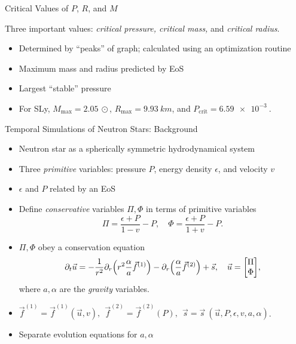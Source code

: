 \documentclass[handout]{beamer}
\newcommand{\p}{\partial}
\begin{document}
\begin{frame}{Critical Values of $P$, $R$, and $M$}
\begin{figure}[h!]
\begin{subfigure}{.5\textwidth}
            \end{subfigure}
        \end{figure} \pause
        Three important values: \pause \textit{critical pressure, critical mass,} and \textit{critical radius}. \pause 
        \begin{itemize}
            \item Determined by ``peaks'' of graph\pause ; calculated using an optimization routine \pause
            \item Maximum mass and radius predicted by EoS \pause
            \item Largest ``stable'' pressure \pause
            \item For SLy, $M_\text{max} = \SI{2.05}{\odot}$, $R_\text{max} = \SI{9.93}{km}$, and $P_\text{crit} = \SI{6.59e-3}{}$.
        \end{itemize}

    \end{frame}



    \begin{frame}{Temporal Simulations of Neutron Stars: Background}
        \begin{itemize}
            \item Neutron star as a spherically symmetric hydrodynamical system
            \item Three \textit{primitive} variables: pressure $P$, energy density $\epsilon$, and velocity $v$
            \item $\epsilon$ and $P$ related by an EoS
            \item Define \textit{conservative} variables $\Pi, \Phi$ in terms of primitive variables
            \[\Pi = \frac{\epsilon + P}{1-v} - P, \quad \Phi = \frac{\epsilon + P}{1+v} - P.\]
            \item $\Pi, \Phi$ obey a conservation equation
            \[\p_t \vec{u} = -\frac{1}{r^2}\p_r\pqty{r^2\frac{\alpha}{a}\vec{f}^{(1)}} - \p_r\qty(\frac{\alpha}{a}\vec{f}^{(2)})+\vec{s}, \quad \vec{u} = \mqty[\Pi\\\Phi],\]
            where $a,\alpha$ are the \textit{gravity} variables.
            \item $\vec{f}^{(1)} = \vec{f}^{(1)} (\vec{u}, v),~~ \vec{f}^{(2)} = \vec{f}^{(2)}(P),~~ \vec{s} = \vec{s}~(\vec{u},P,\epsilon,v,a,\alpha)$.
            \item Separate evolution equations for $a,\alpha$
        \end{itemize}
    \end{frame}
\end{document}
